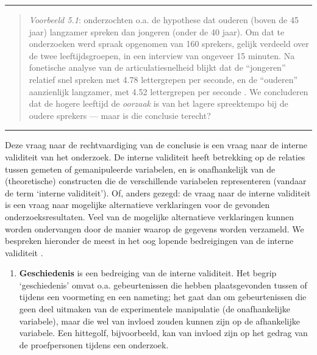 \documentclass[
]{book}
\providecommand{\tightlist}{%
  \setlength{\itemsep}{0pt}\setlength{\parskip}{0pt}}
\begin{document}
\begin{center}\rule{0.5\linewidth}{0.5pt}\end{center}

\begin{quote}
\emph{Voorbeeld 5.1}: \citep{Verh04} onderzochten o.a. de hypothese dat
ouderen (boven de 45 jaar) langzamer spreken dan jongeren (onder de 40
jaar). Om dat te onderzoeken werd spraak opgenomen van 160 sprekers,
gelijk verdeeld over de twee leeftijdsgroepen, in een interview van
ongeveer 15 minuten. Na fonetische analyse van de articulatiesnelheid
blijkt dat de ``jongeren'' relatief snel spreken met 4.78 lettergrepen per
seconde, en de ``ouderen'' aanzienlijk langzamer, met 4.52 lettergrepen
per seconde \citep[p.302]{Verh04}. We concluderen dat de hogere leeftijd de
\emph{oorzaak} is van het lagere spreektempo bij de oudere sprekers --- maar
is die conclusie terecht?
\end{quote}

\begin{center}\rule{0.5\linewidth}{0.5pt}\end{center}

Deze vraag naar de rechtvaardiging van de conclusie is een vraag naar de
interne validiteit van het onderzoek. De interne validiteit heeft
betrekking op de relaties tussen gemeten of gemanipuleerde variabelen,
en is onafhankelijk van de (theoretische) constructen die de
verschillende variabelen representeren (vandaar de term `interne
validiteit'). Of, anders gezegd: de vraag naar de interne validiteit is
een vraag naar mogelijke alternatieve verklaringen voor de gevonden
onderzoeksresultaten. Veel van de mogelijke alternatieve verklaringen
kunnen worden ondervangen door de manier waarop de gegevens worden
verzameld. We bespreken hieronder de meest in het oog lopende
bedreigingen van de interne validiteit \citep{SCC02}.

\begin{enumerate}
\def\labelenumi{\arabic{enumi}.}
\tightlist
\item
  \textbf{Geschiedenis}
  is een bedreiging van de
  interne validiteit. Het begrip `geschiedenis' omvat o.a. gebeurtenissen
  die hebben plaatsgevonden tussen of tijdens een voormeting en een
  nameting; het gaat dan om gebeurtenissen die geen deel uitmaken van de
  experimentele manipulatie (de onafhankelijke variabele), maar die wel
  van invloed zouden kunnen zijn op de afhankelijke variabele. Een
  hittegolf, bijvoorbeeld, kan van invloed zijn op het gedrag van de
  proefpersonen tijdens een onderzoek.
\end{enumerate}
\end{document}
